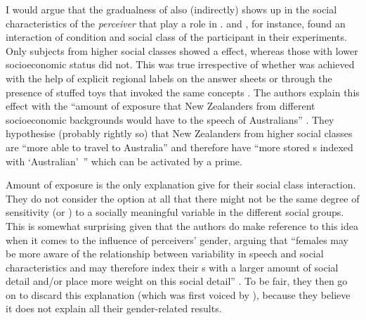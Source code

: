 I would argue that the gradualness of  also (indirectly) shows up in the social characteristics of the \emph{perceiver} that play a role in .
\citealt{hayetal2006a} and \citealt{haydrager2010}, for instance, found an interaction of  condition and social class of the participant in their experiments.
Only subjects from higher social classes showed a  effect, whereas those with lower socioeconomic status did not.
This was true irrespective of whether  was achieved with the help of explicit regional labels on the answer sheets or through the presence of stuffed toys that invoked the same concepts \parencite[cf.][878]{haydrager2010}.
The authors explain this effect with the ``amount of exposure  that New Zealanders from different socioeconomic backgrounds would have to the speech of Australians'' \parencite[878]{haydrager2010}.
They hypothesise (probably rightly so) that New Zealanders from higher social classes are ``more able to travel to Australia'' and therefore have ``more stored s indexed with `Australian'~'' which can be activated by a prime.

Amount of exposure is the only explanation \citeauthor{haydrager2010} give for their social class interaction.
They do not consider the option at all that there might not be the same degree of sensitivity (or ) to a socially meaningful variable in the different social groups.
This is somewhat surprising given that the authors do make reference to this idea when it comes to the influence of perceivers' gender, arguing that ``females may be more aware of the relationship between variability in speech and social characteristics and may therefore index their s with a larger amount of social detail and/or place more weight on this social detail'' \parencite[884]{haydrager2010}.
To be fair, they then go on to discard this explanation (which was first voiced by \citealt{drager2005}), because they believe it does not explain all their gender-related results.

